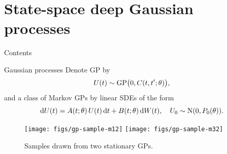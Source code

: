 \documentclass[seriffont, cmap=Beijing, 10pt]{zz}
\begin{document}
\section{State-space deep Gaussian processes}
\begin{frame}{Contents}
	\begin{block}{}
		\tableofcontents[currentsection]
	\end{block}
\end{frame}


\begin{frame}{Gaussian processes}
		Denote GP by
		\begin{equation}
			U(t) \sim \mathrm{GP}\big( 0, C(t,t'; \theta) \big),
		\end{equation}
		and a class of \alert{Markov} GPs by \alert{linear SDEs} of the form
		\begin{equation}
			\mathop{}\!\mathrm{d} U(t) = A(t; \theta) \, U(t) \mathop{}\!\mathrm{d} t + B(t; \theta) \mathop{}\!\mathrm{d} W(t), \quad U_0\sim \mathrm{N}(0, P_0(\theta)).
		\end{equation}
		\begin{figure}
			\centering
			\texttt{[image: figs/gp-sample-m12]}
			\texttt{[image: figs/gp-sample-m32]}
			\caption{Samples drawn from two \alert{stationary} GPs.}
		\end{figure}
\end{frame}
\end{document}
